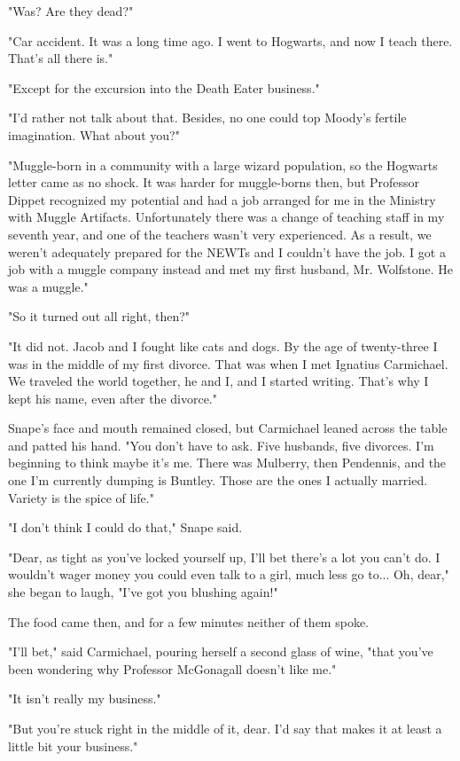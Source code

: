 \documentclass[a4paper,11pt]{article}
\begin{document}
"Was? Are they dead?"

"Car accident. It was a long time ago. I went to Hogwarts, and now I teach there. That's all there is."

"Except for the excursion into the Death Eater business."

"I'd rather not talk about that. Besides, no one could top Moody's fertile imagination. What about you?"

"Muggle-born in a community with a large wizard population, so the Hogwarts letter came as no shock. It was harder for muggle-borns then, but Professor Dippet recognized my potential and had a job arranged for me in the Ministry with Muggle Artifacts. Unfortunately there was a change of teaching staff in my seventh year, and one of the teachers wasn't very experienced. As a result, we weren't adequately prepared for the NEWTs and I couldn't have the job. I got a job with a muggle company instead and met my first husband, Mr. Wolfstone. He was a muggle."

"So it turned out all right, then?"

"It did not. Jacob and I fought like cats and dogs. By the age of twenty-three I was in the middle of my first divorce. That was when I met Ignatius Carmichael. We traveled the world together, he and I, and I started writing. That's why I kept his name, even after the divorce."

Snape's face and mouth remained closed, but Carmichael leaned across the table and patted his hand. "You don't have to ask. Five husbands, five divorces. I'm beginning to think maybe it's me. There was Mulberry, then Pendennis, and the one I'm currently dumping is Buntley. Those are the ones I actually married. Variety is the spice of life."

"I don't think I could do that," Snape said.

"Dear, as tight as you've locked yourself up, I'll bet there's a lot you can't do. I wouldn't wager money you could even talk to a girl, much less go to... Oh, dear," she began to laugh, "I've got you blushing again!"

The food came then, and for a few minutes neither of them spoke.

"I'll bet," said Carmichael, pouring herself a second glass of wine, "that you've been wondering why Professor McGonagall doesn't like me."

"It isn't really my business."

"But you're stuck right in the middle of it, dear. I'd say that makes it at least a little bit your business."
\end{document}
